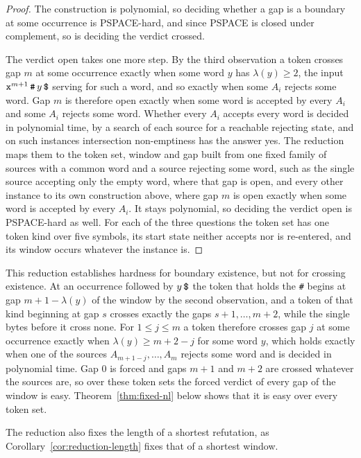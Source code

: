 \documentclass[11pt,a4paper]{article}
\theoremstyle{definition}
\theoremstyle{plain}
\newcommand{\code}[1]{\texttt{#1}}
\begin{document}
\begin{proof}
The construction is polynomial, so deciding whether a gap is a boundary at some occurrence is PSPACE-hard, and since
PSPACE is closed under complement, so is deciding the verdict crossed.

The verdict open takes one more step. By the third observation a token crosses gap $m$ at some occurrence exactly when
some word $y$ has $\lambda(y) \geq 2$, the input $\code{x}^{m+1}\, \code{\#}\, y\, \code{\symbol{36}}$ serving for such
a word, and so exactly when some $A_i$ rejects some word. Gap $m$ is therefore open exactly when some word is accepted
by every $A_i$ and some $A_i$ rejects some word. Whether every $A_i$ accepts every word is decided in polynomial time,
by a search of each source for a reachable rejecting state, and on such instances intersection non-emptiness has the
answer yes. The reduction maps them to the token set, window and gap built from one fixed family of sources with a
common word and a source rejecting some word, such as the single source accepting only the empty word, where that gap is
open, and every other instance to its own construction above, where gap $m$ is open exactly when some word is accepted
by every $A_i$. It stays polynomial, so deciding the verdict open is PSPACE-hard as well. For each of the three
questions the token set has one token kind over five symbols, its start state neither accepts nor is re-entered, and its
window occurs whatever the instance is.
\end{proof}

This reduction establishes hardness for boundary existence, but not for crossing existence. At an occurrence followed by
$y\, \code{\symbol{36}}$ the token that holds the \code{\#} begins at gap $m + 1 - \lambda(y)$ of the window by the
second observation, and a token of that kind beginning at gap $s$ crosses exactly the gaps $s + 1, \ldots, m + 2$, while
the single bytes before it cross none. For $1 \leq j \leq m$ a token therefore crosses gap $j$ at some occurrence
exactly when $\lambda(y) \geq m + 2 - j$ for some word $y$, which holds exactly when one of the sources
$A_{m+1-j}, \ldots, A_m$ rejects some word and is decided in polynomial time. Gap $0$ is forced and gaps $m + 1$ and
$m + 2$ are crossed whatever the sources are, so over these token sets the forced verdict of every gap of the window is
easy. Theorem~\ref{thm:fixed-nl} below shows that it is easy over every token set.

The reduction also fixes the length of a shortest refutation, as Corollary~\ref{cor:reduction-length} fixes that of a
shortest window.
\end{document}
